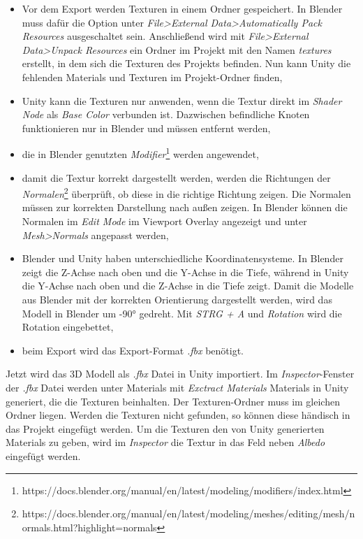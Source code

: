 \begin{itemize}
    \item Vor dem Export werden Texturen in einem Ordner gespeichert. In Blender muss dafür die Option unter \textit{File>External Data>Automatically Pack Resources} ausgeschaltet sein. Anschließend wird mit \textit{File>External Data>Unpack Resources} ein Ordner im Projekt mit den Namen \textit{textures} erstellt, in dem sich die Texturen des Projekts befinden. Nun kann Unity die fehlenden Materials und Texturen im Projekt-Ordner finden,
    \item Unity kann die Texturen nur anwenden, wenn die Textur direkt im \textit{Shader Node} als \textit{Base Color} verbunden ist. Dazwischen befindliche Knoten funktionieren nur in Blender und müssen entfernt werden,
    \item die in Blender genutzten \textit{Modifier}\footnote{https://docs.blender.org/manual/en/latest/modeling/modifiers/index.html} werden angewendet,
    \item damit die Textur korrekt dargestellt werden, werden die Richtungen der \textit{Normalen}\footnote{https://docs.blender.org/manual/en/latest/modeling/meshes/editing/mesh/normals.html?highlight=normals} überprüft, ob diese in die richtige Richtung zeigen. Die Normalen müssen zur korrekten Darstellung nach außen zeigen. In Blender können die Normalen im \textit{Edit Mode} im Viewport Overlay angezeigt und unter \textit{Mesh>Normals} angepasst werden,
    \item Blender und Unity haben unterschiedliche Koordinatensysteme. In Blender zeigt die Z-Achse nach oben und die Y-Achse in die Tiefe, während in Unity die Y-Achse nach oben und die Z-Achse in die Tiefe zeigt. Damit die Modelle aus Blender mit der korrekten Orientierung dargestellt werden, wird das Modell in Blender um -90° gedreht. Mit \textit{STRG + A} und \textit{Rotation} wird die Rotation eingebettet,
    \item beim Export wird das Export-Format \textit{.fbx} benötigt.
\end{itemize}

Jetzt wird das 3D Modell als \textit{.fbx} Datei in Unity importiert. Im \textit{Inspector}-Fenster der \textit{.fbx} Datei werden unter Materials mit \textit{Exctract Materials} Materials in Unity generiert, die die Texturen beinhalten. Der Texturen-Ordner muss im gleichen Ordner liegen. Werden die Texturen nicht gefunden, so können diese händisch in das Projekt eingefügt werden. Um die Texturen den von Unity generierten Materials zu geben, wird im \textit{Inspector} die Textur in das Feld neben \textit{Albedo} eingefügt werden.